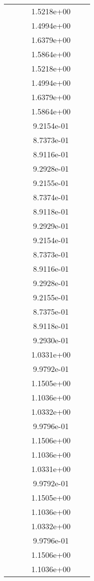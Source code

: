 \begin{xltabular}{\textwidth}{r|rS[table-format=1.3e+2]S[table-format=1.4e+2]S[table-format=1.4e+2]S[table-format=-1.5]}
&  &  & 1.5218e+00 & & \\
&  &  & 1.4994e+00 & & \\
&  &  & 1.6379e+00 & & \\
&  &  & 1.5864e+00 & & \\
&  &  & 1.5218e+00 & & \\
&  &  & 1.4994e+00 & & \\
&  &  & 1.6379e+00 & & \\
&  &  & 1.5864e+00 & & \\
&  &  & 9.2154e-01 & & \\
&  &  & 8.7373e-01 & & \\
&  &  & 8.9116e-01 & & \\
&  &  & 9.2928e-01 & & \\
&  &  & 9.2155e-01 & & \\
&  &  & 8.7374e-01 & & \\
&  &  & 8.9118e-01 & & \\
&  &  & 9.2929e-01 & & \\
&  &  & 9.2154e-01 & & \\
&  &  & 8.7373e-01 & & \\
&  &  & 8.9116e-01 & & \\
&  &  & 9.2928e-01 & & \\
&  &  & 9.2155e-01 & & \\
&  &  & 8.7375e-01 & & \\
&  &  & 8.9118e-01 & & \\
&  &  & 9.2930e-01 & & \\
&  &  & 1.0331e+00 & & \\
&  &  & 9.9792e-01 & & \\
&  &  & 1.1505e+00 & & \\
&  &  & 1.1036e+00 & & \\
&  &  & 1.0332e+00 & & \\
&  &  & 9.9796e-01 & & \\
&  &  & 1.1506e+00 & & \\
&  &  & 1.1036e+00 & & \\
&  &  & 1.0331e+00 & & \\
&  &  & 9.9792e-01 & & \\
&  &  & 1.1505e+00 & & \\
&  &  & 1.1036e+00 & & \\
&  &  & 1.0332e+00 & & \\
&  &  & 9.9796e-01 & & \\
&  &  & 1.1506e+00 & & \\
&  &  & 1.1036e+00 & & \\

\end{xltabular}
